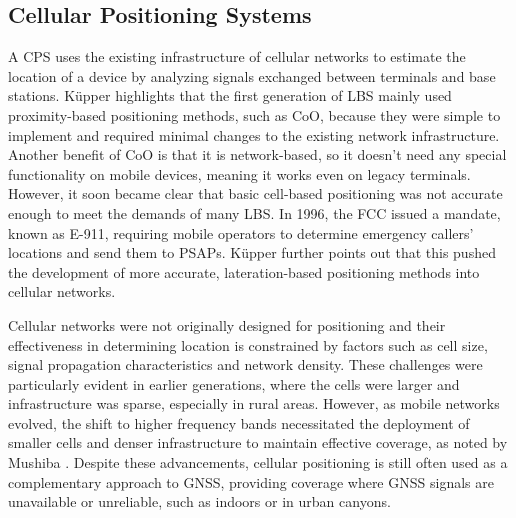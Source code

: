 
\subsection{Cellular Positioning Systems}
A \ac{CPS} uses the existing infrastructure of cellular networks to estimate the location of a device by analyzing signals exchanged between terminals and base stations.
K\"upper \cite{kupper2005location} highlights that the first generation of \ac{LBS} mainly used proximity-based positioning methods, such as \acs{CoO}, because they were simple to implement and required minimal changes to the existing network infrastructure.
Another benefit of \acs{CoO} is that it is network-based, so it doesn't need any special functionality on mobile devices, meaning it works even on legacy terminals.
However, it soon became clear that basic cell-based positioning was not accurate enough to meet the demands of many \acs{LBS}.
In 1996, the \ac{FCC} issued a mandate, known as \ac{E-911}, requiring mobile operators to determine emergency callers' locations and send them to \ac{PSAPs}.
K\"upper \cite{kupper2005location} further points out that this pushed the development of more accurate, lateration-based positioning methods into cellular networks.

Cellular networks were not originally designed for positioning and their effectiveness in determining location is constrained by factors such as cell size, signal propagation characteristics and network density. 
These challenges were particularly evident in earlier generations, where the cells were larger and infrastructure was sparse, especially in rural areas.
However, as mobile networks evolved, the shift to higher frequency bands necessitated the deployment of smaller cells and denser infrastructure to maintain effective coverage, as noted by Mushiba \cite{mushiba2024gsm}. 
Despite these advancements, cellular positioning is still often used as a complementary approach to \acs{GNSS}, providing coverage where \acs{GNSS} signals are unavailable or unreliable, such as indoors or in urban canyons.

